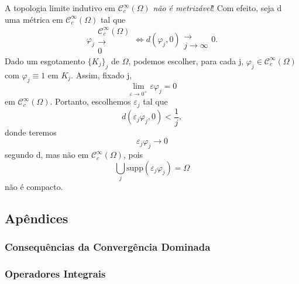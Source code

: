 \documentclass[../distribution_theory_notes.tex]{subfiles}
\begin{document}
                              \begin{tcolorbox}[
                              skin=enhanced,
                              title=Observação,
                              fonttitle=\bfseries,
                            colframe=black,
                              colbacktitle=cyan!75!white, 
                              colback=cyan!15,
                              colbacklower=black,
                            coltitle=black,
                              drop fuzzy shadow,
                              ]
                              A topologia limite indutivo em \(\mathcal{C}_{c}^{\infty}(\Omega )\) \textit{não é metrizável}! Com efeito, seja d uma métrica em \(\mathcal{C}_{c}^{\infty}(\Omega )\) tal que 
                                \[
                                  \varphi_{j}\substack{\mathcal{C}_{c}^{\infty}(\Omega ) \\ \longrightarrow \\ 0} \Longleftrightarrow d(\varphi_{j}, 0)\substack{ \\ \longrightarrow \\ j\to \infty}0.
                                \]
                                Dado um esgotamento \(\{K_{j}\}_{j}\) de \(\Omega \), podemos escolher, para cada j, \(\varphi_{j}\in \mathcal{C}_{c}^{\infty}(\Omega )\) com \(\varphi_{j}\equiv 1\) em \(K_{j}.\) Assim, fixado j, 
                                  \[
                                    \lim_{\varepsilon \to 0^{+}}\varepsilon \varphi_{j}=0
                                  \]
                                  em \(\mathcal{C}_{c}^{\infty}(\Omega )\). Portanto, escolhemos \(\varepsilon_{j}\) tal que 
                                    \[
                                      d(\varepsilon_{j}\varphi_{j}, 0)< \frac{1}{j},
                                    \]
                                    donde teremos 
                                      \[
                                        \varepsilon_{j}\varphi_{j}\to 0
                                      \]
                                      segundo d, mas não em \(\mathcal{C}_{c}^{\infty}(\Omega )\), pois 
                                        \[
                                          \bigcup_{j}^{}\mathrm{supp}(\varepsilon_{j}\varphi_{j})=\Omega 
                                        \]
                                        não é compacto.
                                
                              \end{tcolorbox}
 \subsection{Apêndices}
 \subsubsection{Consequências da Convergência Dominada}
 \subsubsection{Operadores Integrais}
\end{document}
